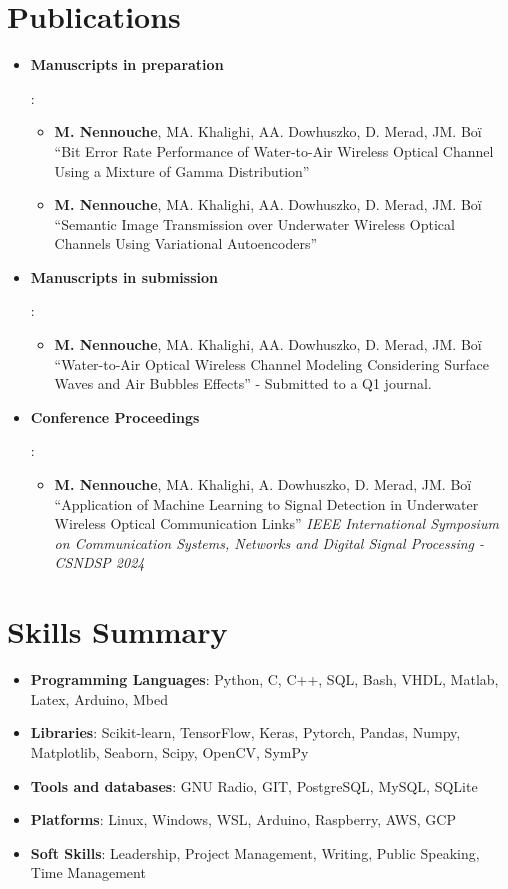 \documentclass[a4paper,20pt]{article}
\newcommand{\resumeItem}[2]{
  \item\small{
    \textbf{#1}{: #2 \vspace{-2pt}}
  }
}
\newcommand{\resumeSubItem}[2]{\resumeItem{#1}{#2}\vspace{-3pt}}
\newcommand{\resumeSubHeadingListStart}{\begin{itemize}[leftmargin=*]}
\newcommand{\resumeSubHeadingListEnd}{\end{itemize}}
\begin{document}
\section{Publications}
  \resumeSubHeadingListStart
  \resumeSubItem{Manuscripts in preparation}{
    \begin{itemize}
      \item \textbf{M. Nennouche}, MA. Khalighi, AA. Dowhuszko, D. Merad, JM. Boï ``Bit Error Rate Performance of Water-to-Air Wireless Optical Channel Using a Mixture of Gamma Distribution''
      \item \textbf{M. Nennouche}, MA. Khalighi, AA. Dowhuszko, D. Merad, JM. Boï ``Semantic Image Transmission over Underwater Wireless Optical Channels Using Variational Autoencoders'' 
    \end{itemize}
  }
  \resumeSubItem{Manuscripts in submission}{
    \begin{itemize}
      \item \textbf{M. Nennouche}, MA. Khalighi, AA.  Dowhuszko, D. Merad, JM. Boï ``Water-to-Air Optical Wireless Channel Modeling Considering Surface Waves and Air Bubbles Effects'' - Submitted to a Q1 journal.
    \end{itemize}
  }
  \vspace{2pt}
  \resumeSubItem{Conference Proceedings}{
    \begin{itemize}
      \item \textbf{M. Nennouche}, MA. Khalighi, A. Dowhuszko, D. Merad, JM. Boï ``Application of Machine Learning to Signal Detection in Underwater Wireless Optical Communication Links'' \textit{IEEE International Symposium on Communication Systems, Networks and Digital Signal Processing - CSNDSP 2024}
    \end{itemize}
  }
  \resumeSubHeadingListEnd

\vspace{-5pt}
\section{Skills Summary}
	\resumeSubHeadingListStart
    \resumeSubItem{Programming Languages}{Python, C, C++, SQL, Bash, VHDL, Matlab, Latex, Arduino, Mbed} %
    \resumeSubItem{Libraries}{Scikit-learn, TensorFlow, Keras, Pytorch, Pandas, Numpy, Matplotlib, Seaborn, Scipy, OpenCV, SymPy} %
    \resumeSubItem{Tools and databases}{GNU Radio, GIT, PostgreSQL, MySQL, SQLite} %
    \resumeSubItem{Platforms}{Linux, Windows, WSL, Arduino, Raspberry, AWS, GCP}
    \resumeSubItem{Soft Skills}{Leadership, Project Management, Writing, Public Speaking, Time Management}
  \resumeSubHeadingListEnd
\end{document}
